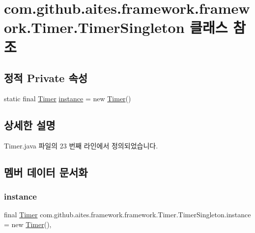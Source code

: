 \hypertarget{classcom_1_1github_1_1aites_1_1framework_1_1framework_1_1_timer_1_1_timer_singleton}{}\section{com.\+github.\+aites.\+framework.\+framework.\+Timer.\+Timer\+Singleton 클래스 참조}
\label{classcom_1_1github_1_1aites_1_1framework_1_1framework_1_1_timer_1_1_timer_singleton}
\subsection*{정적 Private 속성}
\begin{DoxyCompactItemize}
\item 
static final \mbox{\hyperlink{classcom_1_1github_1_1aites_1_1framework_1_1framework_1_1_timer}{Timer}} \mbox{\hyperlink{classcom_1_1github_1_1aites_1_1framework_1_1framework_1_1_timer_1_1_timer_singleton_ae1c42b3d91dd07cb55e95b3f05d22453}{instance}} = new \mbox{\hyperlink{classcom_1_1github_1_1aites_1_1framework_1_1framework_1_1_timer}{Timer}}()
\end{DoxyCompactItemize}


\subsection{상세한 설명}


Timer.\+java 파일의 23 번째 라인에서 정의되었습니다.



\subsection{멤버 데이터 문서화}
\mbox{\label{classcom_1_1github_1_1aites_1_1framework_1_1framework_1_1_timer_1_1_timer_singleton_ae1c42b3d91dd07cb55e95b3f05d22453}} 
\subsubsection{\texorpdfstring{instance}{instance}}
{\footnotesize\ttfamily final \mbox{\hyperlink{classcom_1_1github_1_1aites_1_1framework_1_1framework_1_1_timer}{Timer}} com.\+github.\+aites.\+framework.\+framework.\+Timer.\+Timer\+Singleton.\+instance = new \mbox{\hyperlink{classcom_1_1github_1_1aites_1_1framework_1_1framework_1_1_timer}{Timer}}()\hspace{0.3cm}{\ttfamily [static]}, {\ttfamily [private]}}



